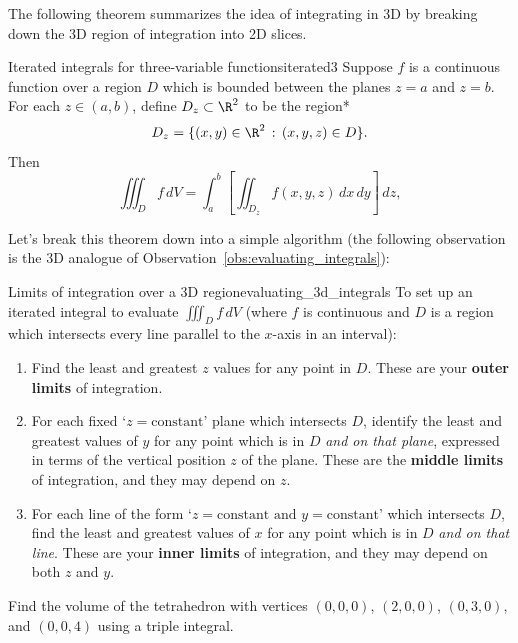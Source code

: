 \documentclass[indent]{watsonbook}
\begin{document}
{The following theorem summarizes the idea of integrating in 3D by
breaking down the 3D region of integration into 2D slices.

\begin{theo}{Iterated integrals for three-variable functions}{iterated3}
  Suppose $f$ is a continuous function over a region $D$ which is
  bounded between the planes $z = a$ and $z = b$. For each
  $z \in (a,b)$, define $D_z \subset \R^2$ to be the region*
  \[
    D_z = \{(x,y) \in \R^2 \, : \, (x,y,z) \in D\}.
  \]
  Then
  \[
    \iiint _D f \, {{d}}V =
    \int_a^b \left[\iint_{D_z} f(x,y,z) \, {d} x \, {d} y \right] \, {{d}}z,
  \]
\end{theo}

Let's break this theorem down into a simple algorithm (the following
observation is the 3D analogue of
Observation~\ref{obs:evaluating_integrals}):

\begin{obs}{Limits of integration over a 3D
    region}{evaluating_3d_integrals}
  To set up an iterated integral to evaluate $\iiint_D f \, {{d}}V$
  (where $f$ is continuous and $D$ is a region which intersects every
  line parallel to the $x$-axis in an interval):
  \begin{enumerate}[itemsep=3pt, topsep = 8pt, leftmargin = 12pt]
  \item Find the least and greatest $z$ values for any point in
    $D$. These are your \textbf{outer limits} of integration.
  \item For each fixed `$z=\text{constant}$' plane which intersects $D$, identify
    the least and greatest values of $y$ for any point which is in $D$
    \textit{and on that plane}, expressed in terms of the vertical
    position $z$ of the plane. These are the \textbf{middle limits} of
    integration, and they may depend on $z$.
  \item For each line of the form
    `$z=\text{constant and }y=\text{constant}$' which intersects $D$,
    find the least and greatest values of $x$ for any point which is
    in $D$ \textit{and on that line}. These are your \textbf{inner
      limits} of integration, and they may depend on both $z$ and $y$.
  \end{enumerate}
\end{obs}

\begin{example}{}{}
  Find the volume of the tetrahedron with vertices $(0,0,0)$,
  $(2,0,0)$, $(0,3,0)$, and $(0,0,4)$ using a triple integral.
\end{example}

}
\end{document}
